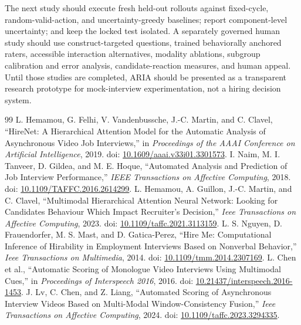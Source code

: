 \documentclass[journal]{IEEEtran}
\begin{document}
The next study should execute fresh held-out rollouts against fixed-cycle, random-valid-action, and uncertainty-greedy baselines; report component-level uncertainty; and keep the locked test isolated. A separately governed human study should use construct-targeted questions, trained behaviorally anchored raters, accessible interaction alternatives, modality ablations, subgroup calibration and error analysis, candidate-reaction measures, and human appeal. Until those studies are completed, ARIA should be presented as a transparent research prototype for mock-interview experimentation, not a hiring decision system.


\begin{thebibliography}{99}
 L. Hemamou, G. Felhi, V. Vandenbussche, J.-C. Martin, and C. Clavel, ``HireNet: A Hierarchical Attention Model for the Automatic Analysis of Asynchronous Video Job Interviews,'' in \emph{Proceedings of the AAAI Conference on Artificial Intelligence}, 2019. doi: \href{https://doi.org/10.1609/aaai.v33i01.3301573}{10.1609/aaai.v33i01.3301573}.
 I. Naim, M. I. Tanveer, D. Gildea, and M. E. Hoque, ``Automated Analysis and Prediction of Job Interview Performance,'' \emph{IEEE Transactions on Affective Computing}, 2018. doi: \href{https://doi.org/10.1109/TAFFC.2016.2614299}{10.1109/TAFFC.2016.2614299}.
 L. Hemamou, A. Guillon, J.-C. Martin, and C. Clavel, ``Multimodal Hierarchical Attention Neural Network: Looking for Candidates Behaviour Which Impact Recruiter's Decision,'' \emph{Ieee Transactions on Affective Computing}, 2023. doi: \href{https://doi.org/10.1109/taffc.2021.3113159}{10.1109/taffc.2021.3113159}.
 L. S. Nguyen, D. Frauendorfer, M. S. Mast, and D. Gatica-Perez, ``Hire Me: Computational Inference of Hirability in Employment Interviews Based on Nonverbal Behavior,'' \emph{Ieee Transactions on Multimedia}, 2014. doi: \href{https://doi.org/10.1109/tmm.2014.2307169}{10.1109/tmm.2014.2307169}.
 L. Chen et al., ``Automatic Scoring of Monologue Video Interviews Using Multimodal Cues,'' in \emph{Proceedings of Interspeech 2016}, 2016. doi: \href{https://doi.org/10.21437/interspeech.2016-1453}{10.21437/interspeech.2016-1453}.
 J. Lv, C. Chen, and Z. Liang, ``Automated Scoring of Asynchronous Interview Videos Based on Multi-Modal Window-Consistency Fusion,'' \emph{Ieee Transactions on Affective Computing}, 2024. doi: \href{https://doi.org/10.1109/taffc.2023.3294335}{10.1109/taffc.2023.3294335}.

\end{thebibliography}
\end{document}
